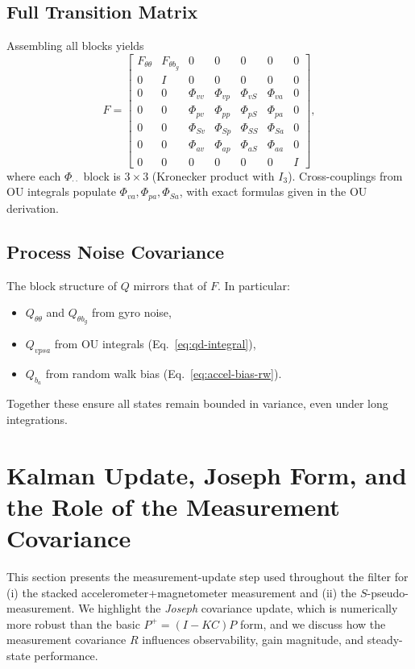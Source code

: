 \documentclass[10pt]{extarticle}
\begin{document}
\subsection{Full Transition Matrix}
Assembling all blocks yields
\begin{equation}
F =
\begin{bmatrix}
F_{\theta\theta} & F_{\theta b_g} & 0 & 0 & 0 & 0 & 0\\
0 & I & 0 & 0 & 0 & 0 & 0\\
0 & 0 & \Phi_{vv} & \Phi_{vp} & \Phi_{vS} & \Phi_{va} & 0\\
0 & 0 & \Phi_{pv} & \Phi_{pp} & \Phi_{pS} & \Phi_{pa} & 0\\
0 & 0 & \Phi_{Sv} & \Phi_{Sp} & \Phi_{SS} & \Phi_{Sa} & 0\\
0 & 0 & \Phi_{av} & \Phi_{ap} & \Phi_{aS} & \Phi_{aa} & 0\\
0 & 0 & 0 & 0 & 0 & 0 & I
\end{bmatrix},
\label{eq:F-full}
\end{equation}
where each $\Phi_{\cdot\cdot}$ block is $3\times 3$ (Kronecker product with $I_3$).
Cross-couplings from OU integrals populate $\Phi_{va},\Phi_{pa},\Phi_{Sa}$,
with exact formulas given in the OU derivation.

\subsection{Process Noise Covariance}
The block structure of $Q$ mirrors that of $F$. In particular:
\begin{itemize}
\item $Q_{\theta\theta}$ and $Q_{\theta b_g}$ from gyro noise,
\item $Q_{vpsa}$ from OU integrals (Eq.~\ref{eq:qd-integral}),
\item $Q_{b_a}$ from random walk bias (Eq.~\ref{eq:accel-bias-rw}).
\end{itemize}
Together these ensure all states remain bounded in variance, even under long integrations.

\section{Kalman Update, Joseph Form, and the Role of the Measurement Covariance}
\label{sec:kalman-update}

This section presents the measurement-update step used throughout the filter for (i) the stacked
accelerometer+magnetometer measurement and (ii) the $S$-pseudo-measurement. We highlight the
\emph{Joseph} covariance update, which is numerically more robust than the basic $P^+=(I-KC)P$ form,
and we discuss how the measurement covariance $R$ influences observability, gain magnitude, and
steady-state performance.
\end{document}
